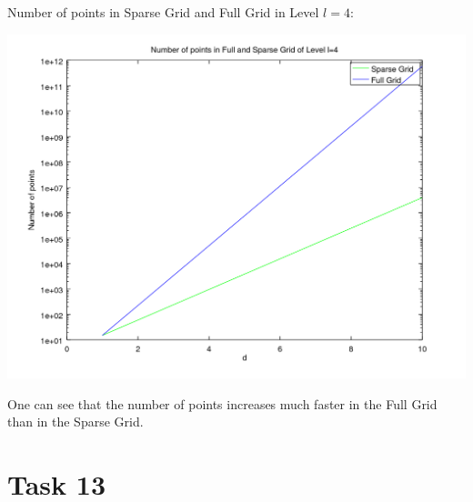 \documentclass[10pt,a4paper]{article}
\begin{document}
Number of points in Sparse Grid and Full Grid in Level $l=4$:
\begin{center}
\includegraphics[scale=0.5]{number_of_points_SG_FG.png}
\end{center}
One can see that the number of points increases much faster in the Full Grid than in the Sparse Grid.

\section*{Task 13}
\end{document}
